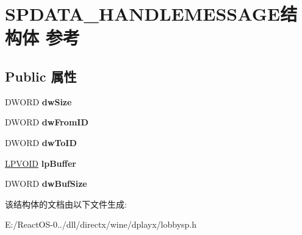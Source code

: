 \hypertarget{struct_s_p_d_a_t_a___h_a_n_d_l_e_m_e_s_s_a_g_e}{}\section{S\+P\+D\+A\+T\+A\+\_\+\+H\+A\+N\+D\+L\+E\+M\+E\+S\+S\+A\+G\+E结构体 参考}
\label{struct_s_p_d_a_t_a___h_a_n_d_l_e_m_e_s_s_a_g_e}
\subsection*{Public 属性}
\begin{DoxyCompactItemize}
\item 
\mbox{\label{struct_s_p_d_a_t_a___h_a_n_d_l_e_m_e_s_s_a_g_e_aee221e27094a848eca29188b45004958}} 
D\+W\+O\+RD {\bfseries dw\+Size}
\item 
\mbox{\label{struct_s_p_d_a_t_a___h_a_n_d_l_e_m_e_s_s_a_g_e_ae314156ab574032622f897d5a5e13c2d}} 
D\+W\+O\+RD {\bfseries dw\+From\+ID}
\item 
\mbox{\label{struct_s_p_d_a_t_a___h_a_n_d_l_e_m_e_s_s_a_g_e_a860689d64d3d68e02c37676cd499f86e}} 
D\+W\+O\+RD {\bfseries dw\+To\+ID}
\item 
\mbox{\label{struct_s_p_d_a_t_a___h_a_n_d_l_e_m_e_s_s_a_g_e_a0dca706f1669c3a51d976aa11138a8d8}} 
\hyperlink{interfacevoid}{L\+P\+V\+O\+ID} {\bfseries lp\+Buffer}
\item 
\mbox{\label{struct_s_p_d_a_t_a___h_a_n_d_l_e_m_e_s_s_a_g_e_a68e55af7fadeb56acff0010a40973fd7}} 
D\+W\+O\+RD {\bfseries dw\+Buf\+Size}
\end{DoxyCompactItemize}


该结构体的文档由以下文件生成\+:\begin{DoxyCompactItemize}
\item 
E\+:/\+React\+O\+S-\/0../dll/directx/wine/dplayx/lobbysp.\+h\end{DoxyCompactItemize}
